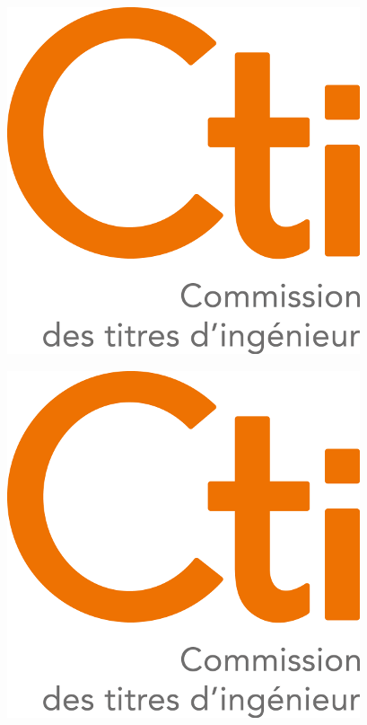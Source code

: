 \documentclass[a4paper]{book}
\begin{document}
\begin{minipage}[c]{0.7in}
  \includegraphics[width=1\linewidth]{logos/cti.png}
\end{minipage}\hfill
\begin{minipage}[c]{0.7in}
  \includegraphics[width=1\linewidth]{logos/cti.png}
\end{minipage}\hfill
\end{document}
